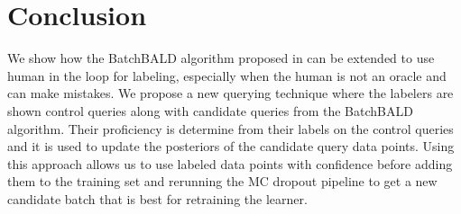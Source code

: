 \documentclass[twoside,11pt]{article}
\newcommand{\dataset}{{\cal D}}
\newcommand{\fracpartial}[2]{\frac{\partial #1}{\partial  #2}}
\begin{document}
\section{Conclusion}

We show how the BatchBALD algorithm proposed in \cite{kirsch2019batchbald} can be extended to use human in the loop for labeling, especially when the human is not an oracle and can make mistakes. We propose a new querying technique where the labelers are shown control queries along with candidate queries from the BatchBALD algorithm. Their proficiency is determine from their labels on the control queries and it is used to update the posteriors of the candidate query data points. Using this approach allows us to use labeled data points with confidence before adding them to the training set and rerunning the MC dropout pipeline to get a new candidate batch that is best for retraining the learner. 










\vskip 0.2in

\end{document}
